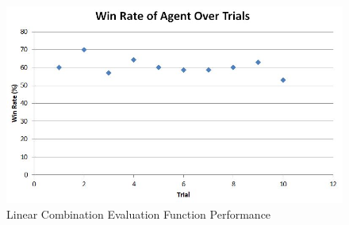 \documentclass[12pt]{article}
\begin{document}
\begin{figure}[htbp]
\centering
\caption{Linear Combination Evaluation Function Performance}
\includegraphics[scale=0.9]{linear-combination-evaluation-function-results.JPG}
\end{figure}
\end{document}
